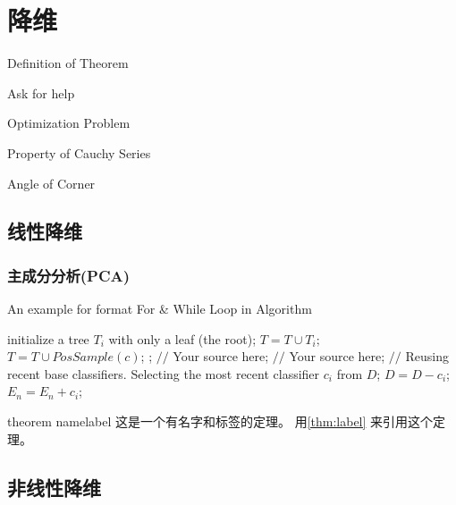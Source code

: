 \chapter{降维}
\begin{introduction}
	\item Definition of Theorem
	\item Ask for help
	\item Optimization Problem
	\item Property of Cauchy Series
	\item Angle of Corner
\end{introduction}



\section{线性降维}

\subsection{主成分分析(PCA)}

\begin{center}
	\begin{minipage}{15cm}
		\begin{algorithm}[H]  
			\caption{An example for format For \& While Loop in Algorithm}  
			\begin{algorithmic}[1]  
				\STATE initialize a tree $T_{i}$ with only a leaf (the root);  
				\STATE $T=T\cup T_{i};$  
				\ENDFOR  
				\label{code:TrainBase:getc}  
				\STATE $T=T\cup PosSample(c)$;  
				\label{code:TrainBase:pos}  
				\ENDFOR;  
				\STATE $//$ Your source here;  
				\ENDFOR  
				\STATE $//$ Your source here;  
				\ENDFOR  
				\STATE $//$ Reusing recent base classifiers.  
				\label{code:recentStart}  
				\STATE Selecting the most recent classifier $c_i$ from $D$;  
				\STATE $D=D-c_i$;  
				\STATE $E_n=E_n+c_i$;  
				\ENDWHILE  
				\label{code:recentEnd}  
			\end{algorithmic}  
		\end{algorithm}  
	\end{minipage}
\end{center}

\begin{theorem}{theorem name}{label}
	这是一个有名字和标签的定理。
	用\ref{thm:label} 来引用这个定理。
\end{theorem}


\section{非线性降维}
